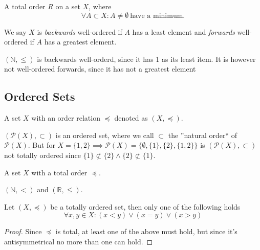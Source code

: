\begin{definition}
   A total order \(R\) on a set \(X\), where
   \[\forall A \subset X: A \neq \emptyset~\text{have a minimum.}\]
\end{definition}
\begin{remark}
   We say \(X\) is \emph{backwards} well-ordered if \(A\) has a least element and \emph{forwards} well-ordered if \(A\) has a greatest element.
\end{remark}
\begin{example}
   \((\mathbb{N}, \leq)\) is backwards well-orderd, since it has 1 as its least item.
   It is however not well-ordered forwards, since it has not a greatest element
\end{example}

\subsection{Ordered Sets}
\begin{definition}
   A set \(X\) with an order relation \(\preceq\) denoted as \((X, \preceq)\).
\end{definition}
\begin{example}
   \((\mathcal{P}(X), \subset)\) is an ordered set, where we call \(\subset\) the ''natural order`` of \(\mathcal{P}(X)\).
   But for \(X = \{1, 2\} \implies \mathcal{P}(X) = \big\{\emptyset, \{1\}, \{2\}, \{1, 2\}\big\}\) is \((\mathcal{P}(X), \subset)\) not totally ordered since \(\{1\} \not\subset \{2\} \land \{2\} \not\subset \{1\}\).
\end{example}

\begin{definition}
   A set \(X\) with a total order \(\preceq\).
\end{definition}
\begin{example}
   \((\mathbb{N}, <)\) and \((\mathbb{R}, \leq)\).
\end{example}

\begin{proposition}
   Let \((X, \preceq)\) be a totally ordered set, then only one of the following holds
   \[\forall x, y \in X: (x < y) \lor (x = y) \lor (x > y)\]
\end{proposition}
\begin{proof}
   Since \(\preceq\) is total, at least one of the above must hold, but since it's antisymmetrical no more than one can hold.
\end{proof}

